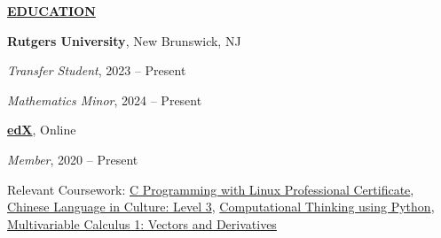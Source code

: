 \documentclass[
]{article}
\providecommand{\tightlist}{%
  \setlength{\itemsep}{0pt}\setlength{\parskip}{0pt}}
\begin{document}





\textbf{\underline{EDUCATION}}

\textbf{Rutgers University}, New Brunswick, NJ

\emph{Transfer Student}, 2023 -- Present

\emph{Mathematics Minor}, 2024 -- Present


\href{https://www.edx.org/}{\textbf{edX}}, Online

\emph{Member}, 2020 -- Present

Relevant Coursework: 
 \href{https://credentials.edx.org/credentials/1782d3571b2945de9b421230968ace62/}{C Programming with Linux Professional Certificate},
 \href{https://courses.edx.org/certificates/675cc428e361416088f6761ff6003cc1}{Chinese Language in Culture: Level 3}, 
\href{https://credentials.edx.org/credentials/de5d12ed05c8442e8b4c238fe2330132/}{Computational Thinking using Python},
 \href{https://courses.edx.org/certificates/427a45b7df034c2a9fb085b0993bdec0}{Multivariable Calculus 1: Vectors and Derivatives} 
\end{document}
